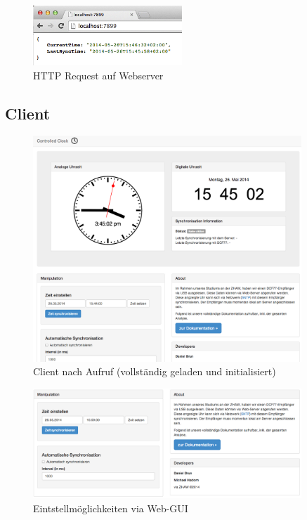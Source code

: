 \begin{figure}[htbp!]
	\caption{HTTP Request auf Webserver}
	\centering
		\includegraphics[width=0.5\textwidth]{./images/screenshots/server_webresponse.png}
\end{figure}

\newpage

\subsection{Client}
\begin{figure}[htbp!]
	\caption{Client nach Aufruf (vollständig geladen und initialisiert)}
	\centering
		\includegraphics[width=0.9\textwidth]{./images/screenshots/client_full_initialised.png}
\end{figure}

\begin{figure}[htbp!]
	\caption{Eintstellmöglichkeiten via Web-GUI}
	\centering
		\includegraphics[width=0.9\textwidth]{./images/screenshots/client_controlling.png}
\end{figure}

